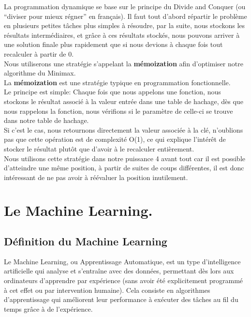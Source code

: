 \documentclass[a4paper, 12pt]{article}
\numberwithin{equation}{subsection}
\begin{document}
La programmation dynamique se base sur le principe du Divide and Conquer (ou ``diviser pour mieux régner'' en français). Il faut tout d'abord répartir le problème en plusieurs petites tâches plus simples à résoudre, par la suite, nous stockons les résultats intermédiaires, et grâce à ces résultats stockés, nous pouvons arriver à une solution finale plus rapidement que si nous devions à chaque fois tout recalculer à partir de 0.\\

Nous utiliserons une stratégie s'appelant la {\bf mémoization} afin d'optimiser notre algorithme du Minimax.\\
La {\bf mémoization} est une stratégie typique en programmation fonctionnelle.\\

Le principe est simple: Chaque fois que nous appelons une fonction, nous stockons le résultat associé à la valeur entrée dans une table de hachage, dès que nous rappelons la fonction, nous vérifions si le paramètre de celle-ci se trouve dans notre table de hachage.\\
Si c'est le cas, nous retournons directement la valeur associée à la clé, n'oublions pas que cette opération est de complexité O(1), ce qui explique l'intérêt de stocker le résultat plutôt que d'avoir à le recalculer entièrement.\\

Nous utilisons cette stratégie dans notre puissance 4 avant tout car il est possible d'atteindre une même position, à partir de suites de coups différentes, il est donc intéressant de ne pas avoir à réévaluer la position inutilement.
\newpage
\section{Le Machine Learning.}
\subsection{Définition du Machine Learning}

Le Machine Learning, ou Apprentissage Automatique, est un type d'intelligence artificielle qui analyse et s'entraîne avec des données, permettant dès lors aux ordinateurs d'apprendre par expérience (sans avoir été explicitement programmé à cet effet ou par intervention humaine). Cela consiste en algorithmes d’apprentissage qui améliorent leur performance à exécuter des tâches au fil du temps grâce à de l’expérience.\\
\end{document}

